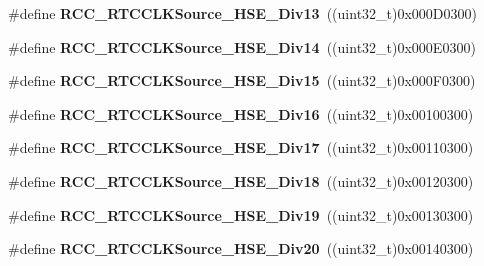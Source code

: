 \begin{DoxyCompactItemize}
\#define {\bfseries R\+C\+C\+\_\+\+R\+T\+C\+C\+L\+K\+Source\+\_\+\+H\+S\+E\+\_\+\+Div13}~((uint32\+\_\+t)0x000\+D0300)
\item 
\mbox{\label{group___r_c_c___r_t_c___clock___source_gabc1ee689e8f45e2a8a5e037f9b931628}} 
\#define {\bfseries R\+C\+C\+\_\+\+R\+T\+C\+C\+L\+K\+Source\+\_\+\+H\+S\+E\+\_\+\+Div14}~((uint32\+\_\+t)0x000\+E0300)
\item 
\mbox{\label{group___r_c_c___r_t_c___clock___source_ga45b090cdf72a82566317d150ba6b2d94}} 
\#define {\bfseries R\+C\+C\+\_\+\+R\+T\+C\+C\+L\+K\+Source\+\_\+\+H\+S\+E\+\_\+\+Div15}~((uint32\+\_\+t)0x000\+F0300)
\item 
\mbox{\label{group___r_c_c___r_t_c___clock___source_gacf80598de73f9291825e3ef005e547c3}} 
\#define {\bfseries R\+C\+C\+\_\+\+R\+T\+C\+C\+L\+K\+Source\+\_\+\+H\+S\+E\+\_\+\+Div16}~((uint32\+\_\+t)0x00100300)
\item 
\mbox{\label{group___r_c_c___r_t_c___clock___source_gaa76bd0695de9e4eb1f305139cabe060a}} 
\#define {\bfseries R\+C\+C\+\_\+\+R\+T\+C\+C\+L\+K\+Source\+\_\+\+H\+S\+E\+\_\+\+Div17}~((uint32\+\_\+t)0x00110300)
\item 
\mbox{\label{group___r_c_c___r_t_c___clock___source_ga1b2330908760ff93d2e1f182aec7b2a1}} 
\#define {\bfseries R\+C\+C\+\_\+\+R\+T\+C\+C\+L\+K\+Source\+\_\+\+H\+S\+E\+\_\+\+Div18}~((uint32\+\_\+t)0x00120300)
\item 
\mbox{\label{group___r_c_c___r_t_c___clock___source_gac5f573747c2aeb34a6e9f85b63aa4b8a}} 
\#define {\bfseries R\+C\+C\+\_\+\+R\+T\+C\+C\+L\+K\+Source\+\_\+\+H\+S\+E\+\_\+\+Div19}~((uint32\+\_\+t)0x00130300)
\item 
\mbox{\label{group___r_c_c___r_t_c___clock___source_ga13f9efb214ab991881957131a1515edb}} 
\#define {\bfseries R\+C\+C\+\_\+\+R\+T\+C\+C\+L\+K\+Source\+\_\+\+H\+S\+E\+\_\+\+Div20}~((uint32\+\_\+t)0x00140300)
\item 
\mbox{\label{group___r_c_c___r_t_c___clock___source_gaa53d1955e045f1abf0b8416afb9dd30a}} 

\end{DoxyCompactItemize}
